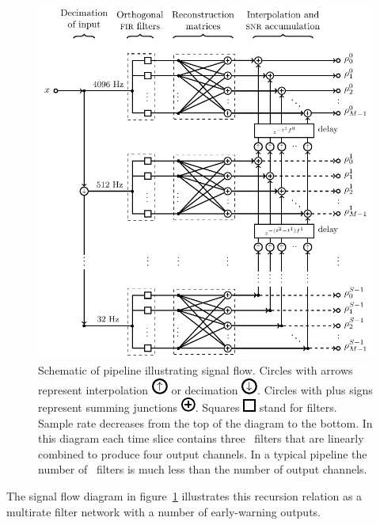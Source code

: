 \begin{figure}[h!]
	\begin{center}
		\includegraphics{figures/lloid-diagram.pdf}
		\caption{\label{fig:pipeline} Schematic of \lloid{} pipeline illustrating
signal flow.  Circles with arrows represent interpolation
\protect\includegraphics{figures/upsample-symbol.pdf} or decimation
\protect\includegraphics{figures/downsample-symbol.pdf}.  Circles with plus
signs represent summing junctions
\protect\includegraphics{figures/adder-symbol.pdf}.  Squares
\protect\includegraphics{figures/fir-symbol.pdf} stand for \fir{} filters.  Sample
rate decreases from the top of the diagram to the bottom.  In this diagram each
time slice contains three \fir\ filters that are linearly combined to produce
four output channels.  In a typical pipeline the number of \fir\ filters is
much less than the number of output channels.}
	\end{center}
\end{figure}
%
%
The signal flow diagram in figure~\ref{fig:pipeline} illustrates this
recursion relation as a multirate filter network with a number of early-warning outputs.


